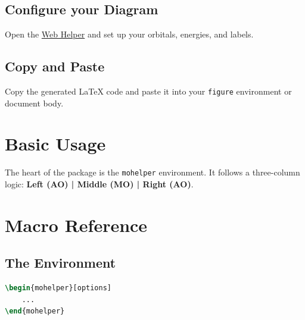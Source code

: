 \documentclass[12pt, a4paper]{article}
\begin{document}
\subsection{Configure your Diagram}
Open the \href{https://thevicraft.github.io/modiagram-latex-integration/}{Web Helper} and set up your orbitals, energies, and labels.

\subsection{Copy and Paste}
Copy the generated LaTeX code and paste it into your \texttt{figure} environment or document body.

\section{Basic Usage}
The heart of the package is the \texttt{mohelper} environment. It follows a three-column logic: \textbf{Left (AO) | Middle (MO) | Right (AO)}.

\begin{figure}[H]
    \centering
    \begin{mohelper}
        \def\columndistance{3}
        \def\diagrammode{normal}
    \end{mohelper}
    \label{fig:modiagram2}
\end{figure}

\section{Macro Reference}

\subsection{The Environment}

\begin{lstlisting}[language=TeX]
\begin{mohelper}[options]
    ...
\end{mohelper}
\end{lstlisting}
\end{document}
